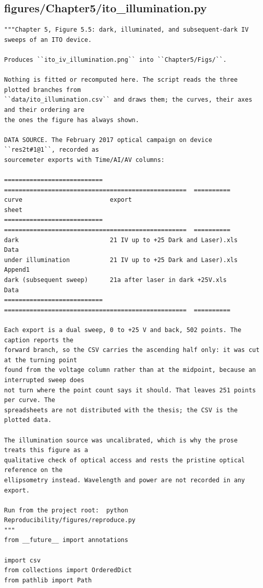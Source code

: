 \documentclass[a4paper,10pt]{article}
\begin{document}
\subsection{figures/Chapter5/ito\_illumination.py}
\begin{Verbatim}
"""Chapter 5, Figure 5.5: dark, illuminated, and subsequent-dark IV sweeps of an ITO device.

Produces ``ito_iv_illumination.png`` into ``Chapter5/Figs/``.

Nothing is fitted or recomputed here. The script reads the three plotted branches from
``data/ito_illumination.csv`` and draws them; the curves, their axes and their ordering are
the ones the figure has always shown.

DATA SOURCE. The February 2017 optical campaign on device ``res2t#1@1``, recorded as
sourcemeter exports with Time/AI/AV columns:

===========================  ==================================================  ==========
curve                        export                                              sheet
===========================  ==================================================  ==========
dark                         21 IV up to +25 Dark and Laser).xls                 Data
under illumination           21 IV up to +25 Dark and Laser).xls                 Append1
dark (subsequent sweep)      21a after laser in dark +25V.xls                    Data
===========================  ==================================================  ==========

Each export is a dual sweep, 0 to +25 V and back, 502 points. The caption reports the
forward branch, so the CSV carries the ascending half only: it was cut at the turning point
found from the voltage column rather than at the midpoint, because an interrupted sweep does
not turn where the point count says it should. That leaves 251 points per curve. The
spreadsheets are not distributed with the thesis; the CSV is the plotted data.

The illumination source was uncalibrated, which is why the prose treats this figure as a
qualitative check of optical access and rests the pristine optical reference on the
ellipsometry instead. Wavelength and power are not recorded in any export.

Run from the project root:  python Reproducibility/figures/reproduce.py
"""
from __future__ import annotations

import csv
from collections import OrderedDict
from pathlib import Path


\end{Verbatim}
\end{document}
